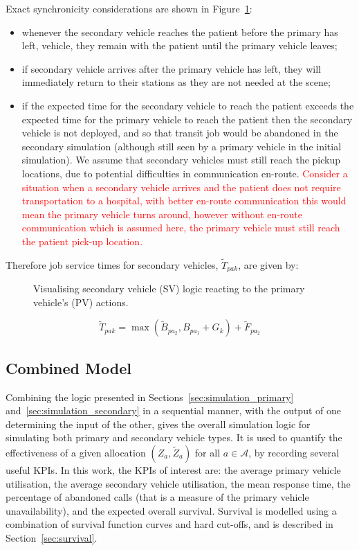 \documentclass[numbers,webpdf,imaman]{ima-authoring-template}%
\begin{document}
Exact synchronicity considerations are shown in Figure~\ref{fig:sequential_logic}:
\begin{itemize}
  \item whenever the secondary vehicle reaches the patient before the primary
  has left, vehicle, they remain with the patient until the primary vehicle
  leaves;
  \item if secondary vehicle arrives after the primary vehicle has left, they
  will immediately return to their stations as they are not needed at the scene;
  \item if the expected time for the secondary vehicle to reach the patient
  exceeds the expected time for the primary vehicle to reach the patient then
  the secondary vehicle is not deployed, and so that transit job would be
  abandoned in the secondary simulation (although still seen by a primary
  vehicle in the initial simulation). We assume that secondary vehicles must
  still reach the pickup locations, due to potential difficulties in
  communication en-route. \textcolor{red}{Consider a situation when a
  secondary vehicle arrives and the patient does not require transportation to
  a hospital, with better en-route communication this would mean the primary
  vehicle turns around, however without en-route communication which is
  assumed here, the primary vehicle must still reach the patient pick-up
  location.}
\end{itemize}

Therefore job service times for secondary vehicles, $\tilde{T}_{pak}$, are
given by:

\begin{figure}
    \centering
    
    \caption{Visualising secondary vehicle (SV) logic reacting to the primary
    vehicle's (PV) actions.}
    \label{fig:sequential_logic}
\end{figure}

\begin{equation}
  \tilde{T}_{pak} = \max\left(\tilde{B}_{pa_2}, B_{pa_1} + G_k \right) + \tilde{F}_{pa_2}
\end{equation}

\subsection{Combined Model}\label{sec:combined_model}
Combining the logic presented in Sections~\ref{sec:simulation_primary}
and~\ref{sec:simulation_secondary} in a sequential manner, with the output of
one determining the input of the other, gives the overall simulation logic for
simulating both primary and secondary vehicle types. It is used to quantify
the effectiveness of a given allocation $(Z_a, \tilde{Z}_a)$ for all
$a \in \mathcal{A}$, by recording several useful KPIs.
In this work, the KPIs of interest are: the average primary vehicle
utilisation, the average secondary vehicle utilisation, the mean response
time, the percentage of abandoned calls (that is a measure of the primary
vehicle unavailability), and the expected overall survival. Survival is
modelled using a combination of survival function curves and hard cut-offs,
and is described in Section~\ref{sec:survival}.
\end{document}
